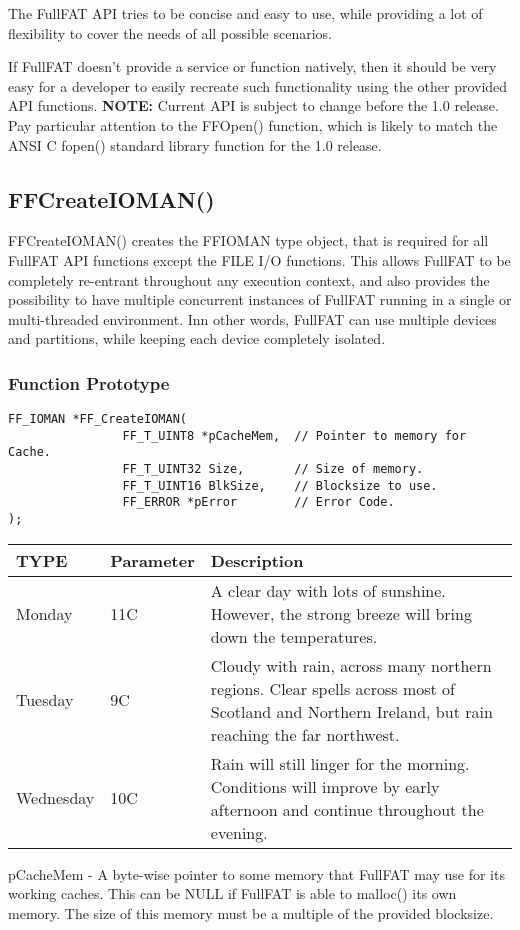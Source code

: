 The FullFAT API tries to be concise and easy to use, while providing a lot of flexibility to cover the needs of all possible scenarios.

If FullFAT doesn't provide a service or function natively, then it should be very easy for a developer to easily recreate such functionality using the other provided API functions.
\newline
\newline
\textbf{NOTE:} Current API is subject to change before the 1.0 release. Pay particular attention to the FF\textunderscore Open() function, which is likely to match the ANSI C fopen() standard library function for the 1.0 release.


\subsection{FF\textunderscore CreateIOMAN()}

FF\textunderscore CreateIOMAN() creates the FF\textunderscore IOMAN type object, that is required for all FullFAT API functions except the FILE I/O functions. This allows FullFAT to be completely re-entrant throughout any execution context, and also provides the possibility to have multiple concurrent instances of FullFAT running in a single or multi-threaded environment. Inn other words, FullFAT can use multiple devices and partitions, while keeping each device completely isolated.
\subsubsection{Function Prototype}
\begin{lstlisting}
FF_IOMAN *FF_CreateIOMAN(
				FF_T_UINT8 *pCacheMem, 	// Pointer to memory for Cache.
				FF_T_UINT32 Size, 		// Size of memory.
				FF_T_UINT16 BlkSize, 	// Blocksize to use.
				FF_ERROR *pError		// Error Code.
);
\end{lstlisting}

\begin{center}
    \begin{tabular}{ | l | l | p{5cm} |}
    \hline
    TYPE & Parameter & Description \\ \hline
    Monday & 11C & A clear day with lots of sunshine.
    However, the strong breeze will bring down the temperatures. \\ \hline
    Tuesday & 9C & Cloudy with rain, across many northern regions. Clear spells 
    across most of Scotland and Northern Ireland, 
    but rain reaching the far northwest. \\ \hline
    Wednesday & 10C & Rain will still linger for the morning. 
    Conditions will improve by early afternoon and continue 
    throughout the evening. \\
    \hline
    \end{tabular}
\end{center}
pCacheMem - A byte-wise pointer to some memory that FullFAT may use for its working caches. This can be NULL if FullFAT is able to malloc() its own memory. The size of this memory must be a multiple of the provided blocksize.

